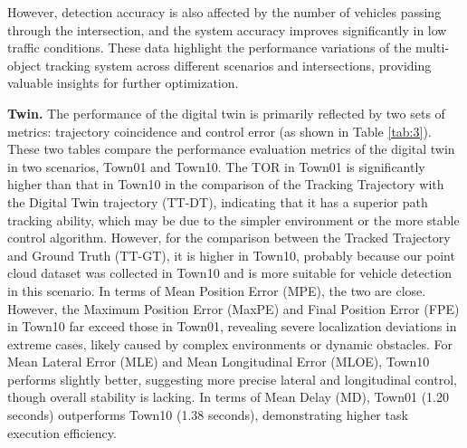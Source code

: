 \documentclass[lettersize,journal]{IEEEtran}
\begin{document}
However, detection accuracy is also affected by the number of vehicles passing through the intersection, and the system accuracy improves significantly in low traffic conditions.
These data highlight the performance variations of the multi-object tracking system across different scenarios and intersections, providing valuable insights for further optimization.

\textbf{Twin.}
The performance of the digital twin is primarily reflected by two sets of metrics: trajectory coincidence and control error (as shown in Table \ref{tab:3}). 
These two tables compare the performance evaluation metrics of the digital twin in two scenarios, Town01 and Town10. 
The TOR in Town01 is significantly higher than that in Town10 in the comparison of the Tracking Trajectory with the Digital Twin trajectory (TT-DT), indicating that it has a superior path tracking ability, which may be due to the simpler environment or the more stable control algorithm.
However, for the comparison between the Tracked Trajectory and Ground Truth (TT-GT), it is higher in Town10, probably because our point cloud dataset was collected in Town10 and is more suitable for vehicle detection in this scenario.
In terms of Mean Position Error (MPE), the two are close. 
However, the Maximum Position Error (MaxPE) and Final Position Error (FPE) in Town10 far exceed those in Town01, revealing severe localization deviations in extreme cases, likely caused by complex environments or dynamic obstacles. 
For Mean Lateral Error (MLE) and Mean Longitudinal Error (MLOE), Town10 performs slightly better, suggesting more precise lateral and longitudinal control, though overall stability is lacking. 
In terms of Mean Delay (MD), Town01 (1.20 seconds) outperforms Town10 (1.38 seconds), demonstrating higher task execution efficiency.

\end{document}
